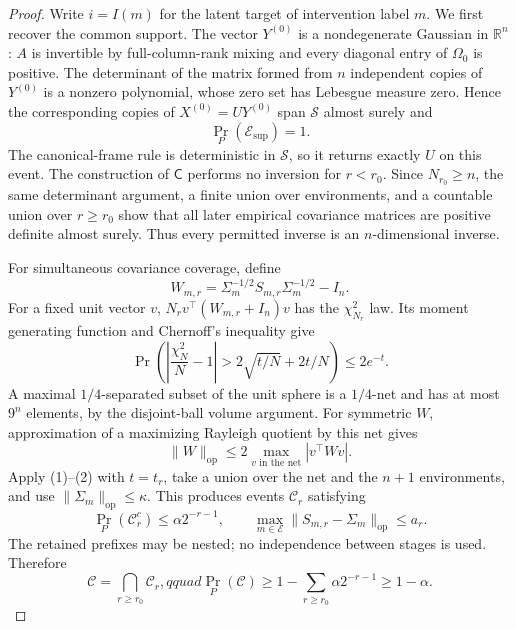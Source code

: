 \documentclass{article}
\begin{document}
\begin{proof}
Write \(i=I(m)\) for the latent target of intervention label \(m\).  We first recover the common support.  The vector \(Y^{(0)}\) is a nondegenerate Gaussian in \(\mathbb R^n\): \(A\) is invertible by full-column-rank mixing and every diagonal entry of \(\Omega_0\) is positive.  The determinant of the matrix formed from \(n\) independent copies of \(Y^{(0)}\) is a nonzero polynomial, whose zero set has Lebesgue measure zero.  Hence the corresponding copies of \(X^{(0)}=UY^{(0)}\) span \(\mathcal S\) almost surely and
\[
 \Pr_P(\mathcal E_{\mathrm{sup}})=1.
\]
The canonical-frame rule is deterministic in \(\mathcal S\), so it returns exactly \(U\) on this event.  The construction of \(\mathsf C\) performs no inversion for \(r<r_0\).  Since \(N_{r_0}\ge n\), the same determinant argument, a finite union over environments, and a countable union over \(r\ge r_0\) show that all later empirical covariance matrices are positive definite almost surely.  Thus every permitted inverse is an \(n\)-dimensional inverse.

For simultaneous covariance coverage, define
\[
 W_{m,r}=\Sigma_m^{-1/2}S_{m,r}\Sigma_m^{-1/2}-I_n.
\]
For a fixed unit vector \(v\), \(N_rv^{\top}(W_{m,r}+I_n)v\) has the \(\chi^2_{N_r}\) law.  Its moment generating function and Chernoff's inequality give
\[
 \Pr\!\left(\left|\frac{\chi^2_N}{N}-1\right|>
 2\sqrt{t/N}+2t/N\right)\le2e^{-t}.
 \tag{1}
\]
A maximal \(1/4\)-separated subset of the unit sphere is a \(1/4\)-net and has at most \(9^n\) elements, by the disjoint-ball volume argument.  For symmetric \(W\), approximation of a maximizing Rayleigh quotient by this net gives
\[
 \|W\|_{\mathrm{op}}\le2\max_{v\text{ in the net}}|v^{\top}Wv|.
 \tag{2}
\]
Apply (1)--(2) with \(t=t_r\), take a union over the net and the \(n+1\) environments, and use \(\|\Sigma_m\|_{\mathrm{op}}\le\kappa\).  This produces events \(\mathcal C_r\) satisfying
\[
 \Pr_P(\mathcal C_r^c)\le\alpha2^{-r-1},\qquad
 \max_{m\in\mathcal E}\|S_{m,r}-\Sigma_m\|_{\mathrm{op}}\le a_r.
 \tag{3}
\]
The retained prefixes may be nested; no independence between stages is used.  Therefore
\[
 \mathcal C=\bigcap_{r\ge r_0}\mathcal C_r,qquad
 \Pr_P(\mathcal C)\ge1-
 \sum_{r\ge r_0}\alpha2^{-r-1}\ge1-\alpha.
 \tag{4}
\]


\end{proof}
\end{document}

